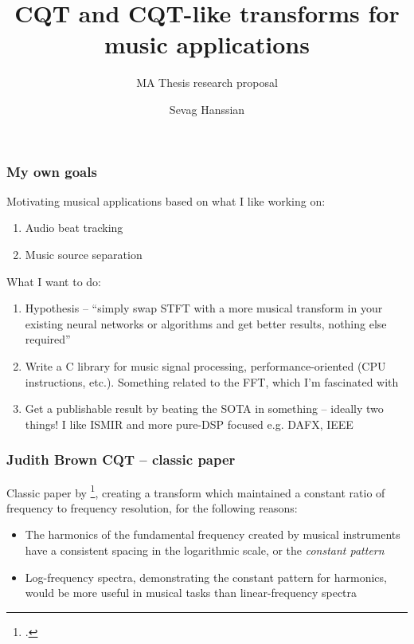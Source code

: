 \documentclass[usenames,dvipsnames]{beamer}
\title{CQT and CQT-like transforms for music applications}
\subtitle{MA Thesis research proposal}
\author{Sevag Hanssian}
\institute{DDMAL, McGill}
\begin{document}
\begin{frame}
\maketitle
\end{frame}

\begin{frame}
	\frametitle{My own goals}
	Motivating musical applications based on what I like working on:
	\begin{enumerate}
		\item
			Audio beat tracking
		\item
			Music source separation
	\end{enumerate}

	What I want to do:
	\begin{enumerate}
		\item
			Hypothesis -- ``simply swap STFT with a more musical transform in your existing neural networks or algorithms and get better results, nothing else required''
		\item
			Write a C library for music signal processing, performance-oriented (CPU instructions, etc.). Something related to the FFT, which I'm fascinated with
		\item
			Get a publishable result by beating the SOTA in something -- ideally two things! I like ISMIR and more pure-DSP focused e.g. DAFX, IEEE
	\end{enumerate}
\end{frame}

\begin{frame}
	\frametitle{Judith Brown CQT -- classic paper}
	Classic paper by \footcite{jbrown}, creating a transform which maintained a constant ratio of frequency to frequency resolution, for the following reasons:
\begin{itemize}
	\item
		The harmonics of the fundamental frequency created by musical instruments have a consistent spacing in the logarithmic scale, or the \textit{constant pattern}
	\item
		Log-frequency spectra, demonstrating the constant pattern for harmonics, would be more useful in musical tasks than linear-frequency spectra
	\end{itemize}
\end{frame}
\end{document}
